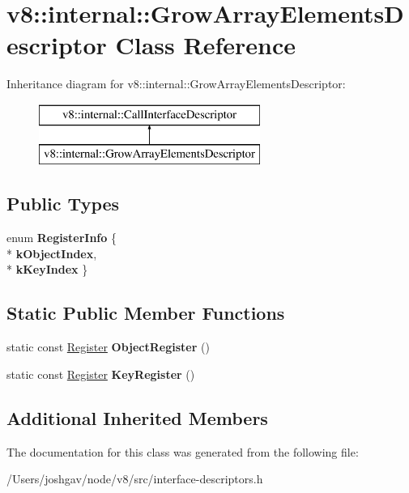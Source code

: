 \hypertarget{classv8_1_1internal_1_1_grow_array_elements_descriptor}{}\section{v8\+:\+:internal\+:\+:Grow\+Array\+Elements\+Descriptor Class Reference}
\label{classv8_1_1internal_1_1_grow_array_elements_descriptor}
Inheritance diagram for v8\+:\+:internal\+:\+:Grow\+Array\+Elements\+Descriptor\+:\begin{figure}[H]
\begin{center}
\leavevmode
\includegraphics[height=2.000000cm]{classv8_1_1internal_1_1_grow_array_elements_descriptor}
\end{center}
\end{figure}
\subsection*{Public Types}
\begin{DoxyCompactItemize}
\item 
enum {\bfseries Register\+Info} \{ \\*
{\bfseries k\+Object\+Index}, 
\\*
{\bfseries k\+Key\+Index}
 \}\hypertarget{classv8_1_1internal_1_1_grow_array_elements_descriptor_abe0af7816e7722f1b88052ec5e580cb7}{}\label{classv8_1_1internal_1_1_grow_array_elements_descriptor_abe0af7816e7722f1b88052ec5e580cb7}

\end{DoxyCompactItemize}
\subsection*{Static Public Member Functions}
\begin{DoxyCompactItemize}
\item 
static const \hyperlink{structv8_1_1internal_1_1_register}{Register} {\bfseries Object\+Register} ()\hypertarget{classv8_1_1internal_1_1_grow_array_elements_descriptor_ad9155e898bd3ec95236d1e02118cc8cd}{}\label{classv8_1_1internal_1_1_grow_array_elements_descriptor_ad9155e898bd3ec95236d1e02118cc8cd}

\item 
static const \hyperlink{structv8_1_1internal_1_1_register}{Register} {\bfseries Key\+Register} ()\hypertarget{classv8_1_1internal_1_1_grow_array_elements_descriptor_a59ef70fe74eecf53cabef8fd555047b2}{}\label{classv8_1_1internal_1_1_grow_array_elements_descriptor_a59ef70fe74eecf53cabef8fd555047b2}

\end{DoxyCompactItemize}
\subsection*{Additional Inherited Members}


The documentation for this class was generated from the following file\+:\begin{DoxyCompactItemize}
\item 
/\+Users/joshgav/node/v8/src/interface-\/descriptors.\+h\end{DoxyCompactItemize}
